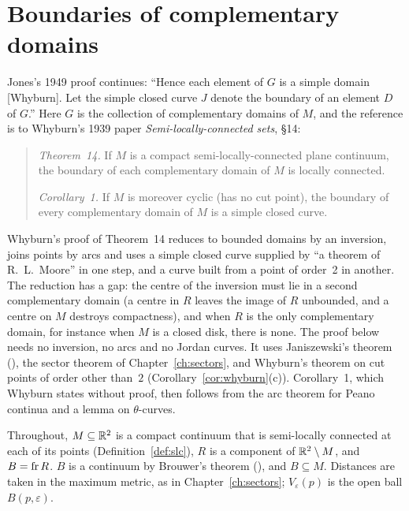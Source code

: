 \chapter{Boundaries of complementary domains}\label{ch:boundaries}

Jones's 1949 proof continues: ``Hence each element of $G$ is a simple domain [Whyburn]. Let the simple closed
curve $J$ denote the boundary of an element $D$ of $G$.'' Here $G$ is the collection of complementary domains
of $M$, and the reference is to Whyburn's 1939 paper \emph{Semi-locally-connected sets}, \S14:

\begin{quote}
\emph{Theorem~14.} If $M$ is a compact semi-locally-connected plane continuum, the boundary of each complementary
domain of $M$ is locally connected.

\emph{Corollary~1.} If $M$ is moreover cyclic (has no cut point), the boundary of every complementary domain of $M$
is a simple closed curve.
\end{quote}

Whyburn's proof of Theorem~14 reduces to bounded domains by an inversion, joins points by arcs and
uses a simple closed curve supplied by ``a theorem of R.~L.~Moore'' in one step, and a curve built
from a point of order~2 in another. The reduction has a gap: the centre of the inversion must lie in a
second complementary domain (a centre in $R$ leaves the image of $R$ unbounded, and a centre on $M$ destroys
compactness), and when $R$ is the only complementary domain, for instance when $M$ is a closed disk, there is none. The proof below needs no inversion, no arcs and no Jordan curves.
It uses Janiszewski's theorem (), the sector theorem of Chapter~\ref{ch:sectors}, and
Whyburn's theorem on cut points of order other than~$2$ (Corollary~\ref{cor:whyburn}(c)). Corollary~1, which
Whyburn states without proof, then follows from the arc theorem for Peano continua and a lemma on
$\theta$-curves.

Throughout, $M\subseteq\mathbb{R}^2$ is a compact continuum that is semi-locally connected at each of its points
(Definition~\ref{def:slc}), $R$ is a component of $\mathbb{R}^2\setminus M$, and $B=\operatorname{fr} R$. $B$ is a continuum by Brouwer's
theorem (), and $B\subseteq M$. Distances are taken in the maximum metric, as in
Chapter~\ref{ch:sectors}; $V_\varepsilon(p)$ is the open ball $B(p,\varepsilon)$.

